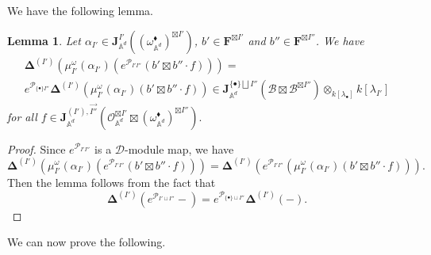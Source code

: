 \documentclass[11pt]{amsart}
\newtheorem{lem}[thm]{Lemma}
\theoremstyle{definition}
\theoremstyle{remark}
\numberwithin{equation}{section}
\begin{document}
We have the following lemma.

\begin{lem}
    Let $\alpha_{{I'}}\in \mathbf{J}_{\mathbb{A}^d}^{{I'}}((\omega_{\mathbb{A}^d}^{\blacklozenge})^{\boxtimes {I'}}) $,
    $b'\in \mathbf{F}^{\boxtimes {I'}}$ and $b''\in \mathbf{F}^{\boxtimes {I''}}$. We have
    \begin{multline}
    \mathbf{\Delta}^{(I')}\left(\mu^{\omega}_{{I'}}(\alpha_{{I'}})(    e^{{\mathcal{P}}_{{I'}{I''}}}(b'\boxtimes
    b''\cdot f ))\right)=\\ e^{{\mathcal{P}}_{\{\bullet\}{I''}}}\mathbf{\Delta}^{(I')}\left(\mu^{\omega}_{{I'}}(\alpha_{{I'}})(b'\boxtimes b''\cdot f) \right)\in \mathbf{J}^{\{\bullet\}\bigsqcup{I''}}_{\mathbb{A}^d}(\mathcal{B}\boxtimes \mathcal{B}^{\boxtimes{I''}})\otimes_{k[\lambda_{\bullet}]}k[\lambda_{I'}]
  \end{multline}
    for all $f\in \mathbf{J}^{({I'}),\vec{{I''}}}_{\mathbb{A}^d}(\mathcal{O}_{\mathbb{A}^d}^{\boxtimes{I'}}\boxtimes(\omega_{\mathbb{A}^d}^{\blacklozenge})^{\boxtimes{I''}}).
$
\end{lem}
\begin{proof}
Since $  e^{{\mathcal{P}}_{{I'}{I''}}}$ is a $\mathcal{D}$-module map, we have
$$
\mathbf{\Delta}^{(I')}\left(\mu^{\omega}_{{I'}}(\alpha_{{I'}})(    e^{{\mathcal{P}}_{{I'}{I''}}}(b'\boxtimes b''\cdot f ))\right)=\mathbf{\Delta}^{(I')}\left(e^{{\mathcal{P}}_{{I'}{I''}}}(\mu^{\omega}_{{I'}}(\alpha_{{I'}})(    b'\boxtimes b''\cdot f ))\right).
$$
Then the lemma follows from the fact that
$$
\mathbf{\Delta}^{(I')}\left(e^{{\mathcal{P}}_{I' \sqcup I''}}-\right)=e^{{\mathcal{P}}_{\{\bullet\} \sqcup I''}}\mathbf{\Delta}^{(I')}\left(-\right).
$$
\iffalse

    This follows from the following observation
    $$
    \lambda^s_{i'}\cdot \left(b'\boxtimes b''\cdot f\cdot e^{\overleftarrow{\mathcal{P}}_{\vec{I'}\vec{I''}}}\right)=\partial_{z^s_{i'}}b'\boxtimes b''\cdot f\cdot e^{\overleftarrow{\mathcal{P}}_{\vec{I'}\vec{I''}}}+b'\boxtimes b''\cdot e^{\overleftarrow{\mathcal{P}}_{\vec{I'}\vec{I''}}}\cdot \lambda^s_{i'} \cdot f.
    $$
\fi

\end{proof}

We can now prove the following.
\end{document}

